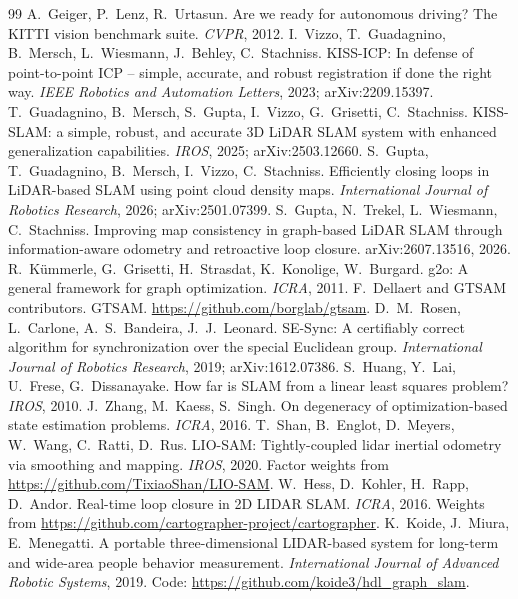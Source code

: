\documentclass[11pt,a4paper]{article}
\begin{document}
\begin{thebibliography}{99}
 A.~Geiger, P.~Lenz, R.~Urtasun. Are we ready for autonomous driving? The KITTI vision benchmark
suite. \emph{CVPR}, 2012.
 I.~Vizzo, T.~Guadagnino, B.~Mersch, L.~Wiesmann, J.~Behley, C.~Stachniss. KISS-ICP: In defense of
point-to-point ICP -- simple, accurate, and robust registration if done the right way. \emph{IEEE Robotics and
Automation Letters}, 2023; arXiv:2209.15397.
 T.~Guadagnino, B.~Mersch, S.~Gupta, I.~Vizzo, G.~Grisetti, C.~Stachniss. KISS-SLAM: a simple,
robust, and accurate 3D LiDAR SLAM system with enhanced generalization capabilities. \emph{IROS}, 2025;
arXiv:2503.12660.
 S.~Gupta, T.~Guadagnino, B.~Mersch, I.~Vizzo, C.~Stachniss. Efficiently closing loops in
LiDAR-based SLAM using point cloud density maps. \emph{International Journal of Robotics Research}, 2026;
arXiv:2501.07399.
 S.~Gupta, N.~Trekel, L.~Wiesmann, C.~Stachniss. Improving map consistency in graph-based LiDAR
SLAM through information-aware odometry and retroactive loop closure. arXiv:2607.13516, 2026.
 R.~K\"ummerle, G.~Grisetti, H.~Strasdat, K.~Konolige, W.~Burgard. g2o: A general framework for graph
optimization. \emph{ICRA}, 2011.
 F.~Dellaert and GTSAM contributors. GTSAM. \url{https://github.com/borglab/gtsam}.
 D.~M.~Rosen, L.~Carlone, A.~S.~Bandeira, J.~J.~Leonard. SE-Sync: A certifiably correct algorithm
for synchronization over the special Euclidean group. \emph{International Journal of Robotics Research}, 2019;
arXiv:1612.07386.
 S.~Huang, Y.~Lai, U.~Frese, G.~Dissanayake. How far is SLAM from a linear least squares
problem? \emph{IROS}, 2010.
 J.~Zhang, M.~Kaess, S.~Singh. On degeneracy of optimization-based state estimation problems.
\emph{ICRA}, 2016.
 T.~Shan, B.~Englot, D.~Meyers, W.~Wang, C.~Ratti, D.~Rus. LIO-SAM: Tightly-coupled lidar inertial
odometry via smoothing and mapping. \emph{IROS}, 2020. Factor weights from \url{https://github.com/TixiaoShan/LIO-SAM}.
 W.~Hess, D.~Kohler, H.~Rapp, D.~Andor. Real-time loop closure in 2D LIDAR SLAM.
\emph{ICRA}, 2016. Weights from \url{https://github.com/cartographer-project/cartographer}.
 K.~Koide, J.~Miura, E.~Menegatti. A portable three-dimensional LIDAR-based system for
long-term and wide-area people behavior measurement. \emph{International Journal of Advanced Robotic Systems},
2019. Code: \url{https://github.com/koide3/hdl_graph_slam}.

\end{thebibliography}
\end{document}

